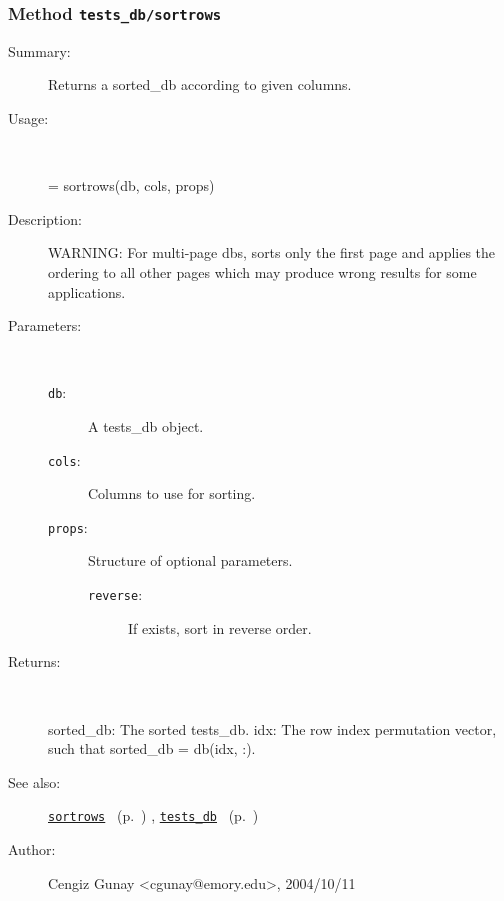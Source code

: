\subsubsection[Method \texttt{sortrows}]{Method \texttt{tests\_db/sortrows}}%
%
\label{ref_tests_db__sortrows}%
\hypertarget{ref_tests_db__sortrows}{}%
\begin{description}
\item[Summary:]Returns a sorted\_db according to given columns. 
%
\item[Usage:]~%
\begin{lyxcode}%
[sorted\_db, idx] = sortrows(db, cols, props)
%
\end{lyxcode}%
%
\item[Description:]%
WARNING: For multi-page dbs, sorts only the first page and applies the ordering 
 to all other pages which may produce wrong results for some applications.
\item[Parameters:]~
\begin{description}%
\item[\texttt{db}:]
 A tests\_db object.
\item[\texttt{cols}:]
 Columns to use for sorting.
\item[\texttt{props}:]
 Structure of optional parameters.
\begin{description}%
\item[\texttt{reverse}:]
 If exists, sort in reverse order.
\end{description}%
\end{description}%
%
\item[Returns:
]~

	sorted\_db: The sorted tests\_db.
	idx: The row index permutation vector, such that sorted\_db = db(idx, :). 
%
%
\item[See also:]%
\hyperlink{ref_sortrows}{\texttt{sortrows}}%
\ (p.~\pageref{ref_sortrows})%
%
, \hyperlink{ref_tests_db}{\texttt{tests\_db}}%
\ (p.~\pageref{ref_tests_db})%
%
%
\item[Author:]%
Cengiz Gunay <cgunay@emory.edu>, 2004/10/11
%
\end{description}
\methodline%
